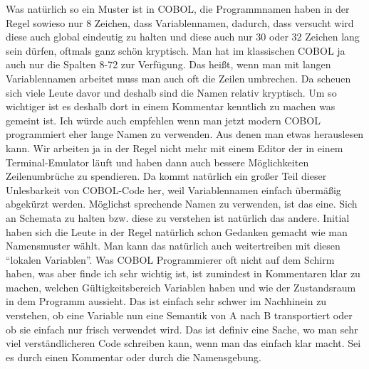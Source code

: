 {Was natürlich so ein Muster ist in COBOL, die Programmnamen haben in der Regel sowieso nur 8 Zeichen, dass Variablennamen, dadurch, dass versucht wird diese auch global eindeutig zu halten und diese auch nur 30 oder 32 Zeichen lang sein dürfen, oftmals ganz schön kryptisch. Man hat im klassischen COBOL ja auch nur die Spalten 8-72 zur Verfügung. Das heißt, wenn man mit langen Variablennamen arbeitet muss man auch oft die Zeilen umbrechen. Da scheuen sich viele Leute davor und deshalb sind die Namen relativ kryptisch. Um so wichtiger ist es deshalb dort in einem Kommentar kenntlich zu machen was gemeint ist. Ich würde auch empfehlen wenn man jetzt modern COBOL programmiert eher lange Namen zu verwenden. Aus denen man etwas herauslesen kann. Wir arbeiten ja in der Regel nicht mehr mit einem Editor der in einem Terminal-Emulator läuft und haben dann auch bessere Möglichkeiten Zeilenumbrüche zu spendieren. Da kommt natürlich ein großer Teil dieser Unlesbarkeit von COBOL-Code her, weil Variablennamen einfach übermäßig abgekürzt werden. Möglichst sprechende Namen zu verwenden, ist das eine. Sich an Schemata zu halten bzw. diese zu verstehen ist natürlich das andere. Initial haben sich die Leute in der Regel natürlich schon Gedanken gemacht wie man Namensmuster wählt. Man kann das natürlich auch weitertreiben mit diesen ``lokalen Variablen''. Was COBOL Programmierer oft nicht auf dem Schirm haben, was aber finde ich sehr wichtig ist, ist zumindest in Kommentaren klar zu machen, welchen Gültigkeitsbereich Variablen haben und wie der Zustandsraum in dem Programm aussieht. Das ist einfach sehr schwer im Nachhinein zu verstehen, ob eine Variable nun eine Semantik von A nach B transportiert oder ob sie einfach nur frisch verwendet wird. Das ist definiv eine Sache, wo man sehr viel verständlicheren Code schreiben kann, wenn man das einfach klar macht. Sei es durch einen Kommentar oder durch die Namensgebung.

}
